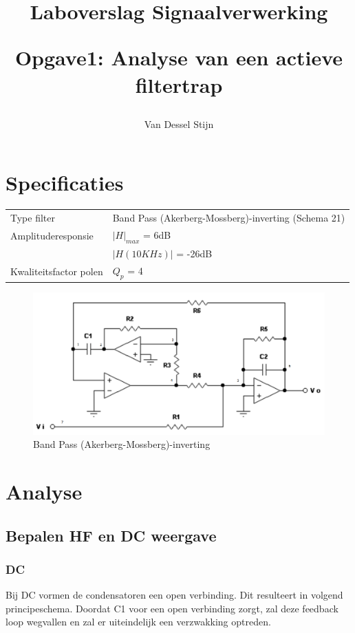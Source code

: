 \documentclass[]{article}
\title{
Laboverslag Signaalverwerking \\ 
\begin{large} 
Opgave1: Analyse van een actieve filtertrap
\end{large} }
\author{Van Dessel Stijn}
\begin{document}
\maketitle

\section{Specificaties}

\begin{tabular}{ l l }
Type filter 			&  Band Pass (Akerberg-Mossberg)-inverting (Schema 21)\\
Amplituderesponsie 		&  $|H|_{max}$ = 6dB  \\
						&  $|H(10 KHz)|$ = -26dB  \\
Kwaliteitsfactor polen 	&  $Q_p$ = 4  \\
\end{tabular}


\begin{figure}[h]
\centering
\includegraphics[scale=0.4]{schema}
\caption{Band Pass (Akerberg-Mossberg)-inverting}
\label{fig:schema}
\end{figure}


\section{Analyse}

\subsection*{Bepalen HF en DC weergave}

\subsubsection*{DC}

Bij DC vormen de condensatoren een open verbinding. Dit resulteert in volgend
principeschema. Doordat C1 voor een open verbinding zorgt, zal deze feedback
loop wegvallen en zal er uiteindelijk een verzwakking optreden.
\end{document}
